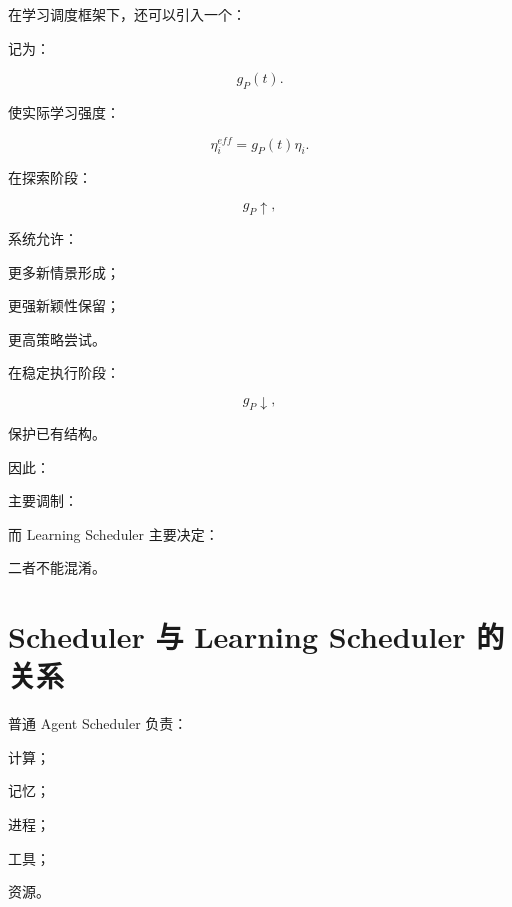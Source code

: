 在学习调度框架下，还可以引入一个：

\begin{statementbox}
\centering
{}
\end{statementbox}

记为：

\[
g_P(t).
\]

使实际学习强度：

\[
\boxed{
\eta_i^{eff}
=
g_P(t)\eta_i.
}
\]

在探索阶段：

\[
g_P\uparrow,
\]

系统允许：

更多新情景形成；

更强新颖性保留；

更高策略尝试。

在稳定执行阶段：

\[
g_P\downarrow,
\]

保护已有结构。

因此：

\begin{statementbox}
\centering
{}
\end{statementbox}

主要调制：

\begin{statementbox}
\centering
{}
\end{statementbox}

而 Learning Scheduler 主要决定：

\begin{statementbox}
\centering
{}
\end{statementbox}

二者不能混淆。


\section{Scheduler 与 Learning Scheduler 的关系}

普通 Agent Scheduler 负责：

计算；

记忆；

进程；

工具；

资源。

